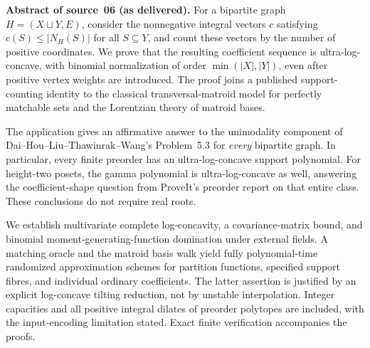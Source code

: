 \documentclass[11pt]{article}
\numberwithin{equation}{section}
\theoremstyle{definition}
\begin{document}
\begin{tcolorbox}[colback=white,colframe=Pale,arc=1mm]
\small\textbf{Abstract of source~06 (as delivered).}
For a bipartite graph $H=(X\sqcup Y,E)$, consider the nonnegative integral
vectors $c$ satisfying $c(S)\le |N_H(S)|$ for all $S\subseteq Y$, and count
these vectors by the number of positive coordinates. We prove that the
resulting coefficient sequence is ultra-log-concave, with binomial
normalization of order $\min(|X|,|Y|)$, even after positive vertex weights
are introduced. The proof joins a published support-counting identity to
the classical transversal-matroid model for perfectly matchable sets and
the Lorentzian theory of matroid bases.

The application gives an affirmative answer to the unimodality component
of Dai--Hou--Liu--Thawinrak--Wang's Problem~5.3 for \emph{every} bipartite
graph. In particular, every finite preorder has an ultra-log-concave support
polynomial. For height-two posets, the gamma polynomial is ultra-log-concave
as well, answering the coefficient-shape question from ProveIt's preorder
report on that entire class. These conclusions do not require real roots.

We establish multivariate complete log-concavity, a covariance-matrix bound,
and binomial moment-generating-function domination under external fields.
A matching oracle and the matroid basis walk yield fully polynomial-time
randomized approximation schemes for partition functions, specified
support fibres, and individual ordinary coefficients. The latter assertion
is justified by an explicit log-concave tilting reduction, not by unstable
interpolation. Integer capacities and all positive integral dilates of
preorder polytopes are included, with the input-encoding limitation stated.
Exact finite verification accompanies the proofs.
\end{tcolorbox}
\end{document}
